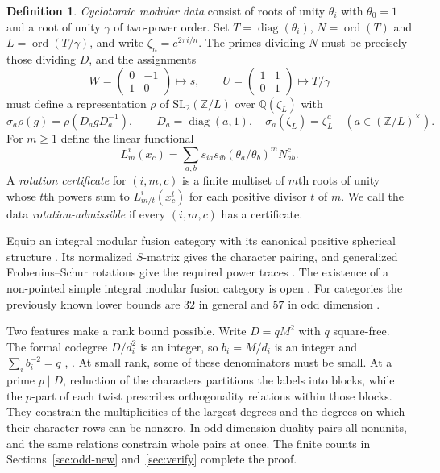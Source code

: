 \documentclass[11pt]{amsart}
\numberwithin{equation}{section}
\theoremstyle{definition}
\newtheorem{definition}[theorem]{Definition}
\theoremstyle{plain}
\newcommand{\QQ}{\mathbb Q}
\newcommand{\ZZ}{\mathbb Z}
\begin{document}
\begin{definition}\label{alg:mod-data}
\emph{Cyclotomic modular data} consist of roots of unity $\theta_i$
with $\theta_0=1$ and a root of unity $\gamma$ of two-power order.
Set $T=\operatorname{diag}(\theta_i)$,
$N=\operatorname{ord}(T)$ and $L=\operatorname{ord}(T/\gamma)$, and write $\zeta_n=e^{2\pi i/n}$.
The primes dividing $N$ must be precisely those dividing $D$, and
the assignments
\[
 W=\left(\begin{smallmatrix}0&-1\\1&0\end{smallmatrix}\right)
 \longmapsto s,\qquad
 U=\left(\begin{smallmatrix}1&1\\0&1\end{smallmatrix}\right)
 \longmapsto T/\gamma
\]
must define a representation $\rho$ of $\mathrm{SL}_2(\ZZ/L)$ over
$\QQ(\zeta_L)$ with
\begin{equation}\label{alg:covariance}
 \sigma_a\rho(g)=\rho(D_a gD_a^{-1}),\qquad
 D_a=\operatorname{diag}(a,1),\quad \sigma_a(\zeta_L)=\zeta_L^a
 \quad (a\in(\ZZ/L)^\times).
\end{equation}
For $m\ge1$ define the linear functional
\begin{equation}\label{alg:rotation}
 L_m^i(x_c)=\sum_{a,b}s_{ia}s_{ib}(\theta_a/\theta_b)^m N_{ab}^c .
\end{equation}
A \emph{rotation certificate} for $(i,m,c)$ is a finite multiset
of $m$th roots of unity whose $t$th powers sum to $L_{m/t}^i(x_c^t)$
for each positive divisor $t$ of $m$. We call the data
\emph{rotation-admissible} if every $(i,m,c)$ has a certificate.
\end{definition}

Equip an integral modular fusion category with its canonical positive spherical structure \cite[Propositions~8.23--8.24]{ENOannals}. Its normalized $S$-matrix gives the character pairing, and generalized Frobenius--Schur rotations give the required power traces \cite{DLNCongruence,NSind}. The existence of a non-pointed simple integral modular fusion category is open \cite[Question~1.3 and Theorem~5.8]{LPR}. For categories the previously known lower bounds are $32$ in general and $57$ in odd dimension \cite[Theorem~22.2]{BDPcore}.

Two features make a rank bound possible. Write $D=qM^2$ with $q$ square-free. The formal codegree $D/d_i^2$ is an integer, so $b_i=M/d_i$ is an integer and $\sum_i b_i^{-2}=q$ \cite[Lemma~2.3]{HR}, \cite[\S4]{ABPP}. At small rank, some of these denominators must be small. At a prime $p\mid D$, reduction of the characters partitions the labels into blocks, while the $p$-part of each twist prescribes orthogonality relations within those blocks. They constrain the multiplicities of the largest degrees and the degrees on which their character rows can be nonzero. In odd dimension duality pairs all nonunits, and the same relations constrain whole pairs at once. The finite counts in Sections~\ref{sec:odd-new} and~\ref{sec:verify} complete the proof.
\end{document}
